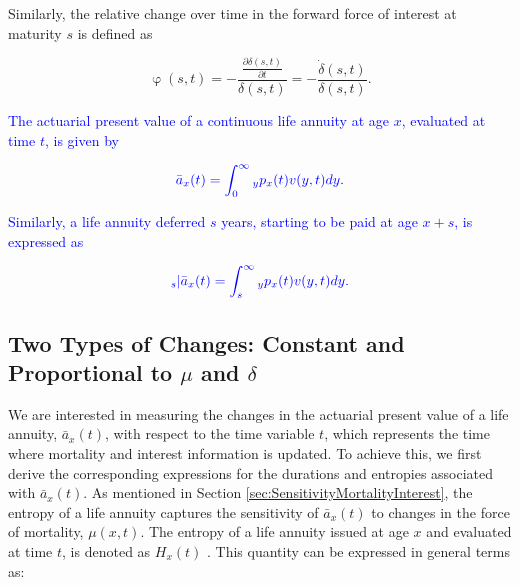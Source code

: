 \documentclass[12pt]{article}
\newcommand{\revision}[1]{\textcolor{blue}{#1}}
\begin{document}
Similarly, the relative change over time in the forward force of interest at maturity $s$ is defined as 

\begin{equation} \label{eq:phi}
\upvarphi(s,t)=-\frac{\frac{\partial \delta(s,t)}{\partial t}}{\delta(s,t)} = -\frac{\dot{\delta}(s,t)}{\delta(s,t)}.
\end{equation}

\revision{The actuarial present value of a continuous life annuity at age $x$, evaluated at time $t$, is given by}

\begin{equation}\label{eq:Annuity}
\revision{\bar{a}_x(t) = \int_0^\infty {}_yp_x(t) {v}(y,t)dy.}
\end{equation}

\revision{Similarly, a life annuity deferred $s$ years, starting to be paid at age $x+s$, is expressed as}

\begin{equation}\label{eq:DefAnnuity}
\revision{{}_s|\bar{a}_x(t) = \int_s^{\infty} {}_yp_x(t) v(y,t) dy.}
\end{equation}

% 
% 
\subsection{Two Types of Changes: Constant and Proportional to $\mu$ and $\delta$}


We are interested in measuring the changes in the actuarial present value of a life annuity, \( \bar{a}_x(t) \), with respect to the time variable \( t \), which represents the time where mortality and interest information is updated. To achieve this, we first derive the corresponding expressions for the durations and entropies associated with \( \bar{a}_x(t) \). As mentioned in Section \ref{sec:SensitivityMortalityInterest}, the entropy of a life annuity captures the sensitivity of \( \bar{a}_x(t) \) to changes in the force of mortality, \( \mu(x,t) \). The entropy of a life annuity issued at age \( x \) and evaluated at time \( t \), is denoted as \( H_x(t) \)   \revision{\citep{Haberman2011}}. This quantity can be expressed in general terms as:
\end{document}
